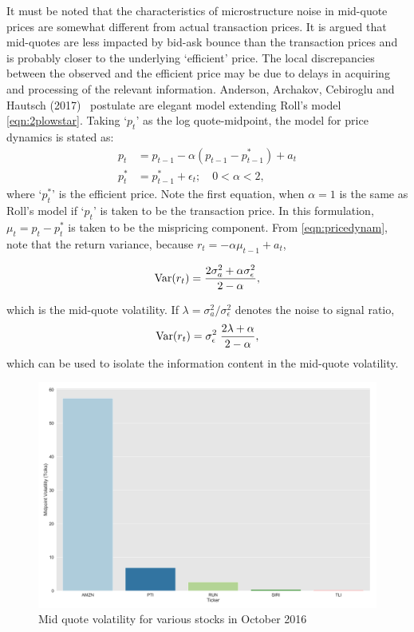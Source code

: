 It must be noted that the characteristics of microstructure noise in mid-quote prices are somewhat different from actual transaction prices. It is argued that mid-quotes are less impacted by bid-ask bounce than the transaction prices and is probably closer to the underlying `efficient' price. The local discrepancies between the observed and the efficient price may be due to delays in acquiring and processing of the relevant information. Anderson, Archakov, Cebiroglu and Hautsch (2017)~\cite{archcebha17} postulate are elegant model extending Roll's model \eqref{eqn:2plowstar}. Taking `$p_t$' as the log quote-midpoint, the model for price dynamics is stated as:
	\begin{equation}\label{eqn:pricedynam}	
	\begin{split}
	p_t&= p_{t-1} - \alpha (p_{t-1} - p_{t-1}^*) + a_t \\
	p_t^*&= p_{t-1}^* + \epsilon_t; \quad 0<\alpha<2,
	\end{split}
	\end{equation}
where `$p_t^*$' is the efficient price. Note the first equation, when $\alpha=1$ is the same as Roll's model if `$p_t$' is taken to be the transaction price. In this formulation, $\mu_t= p_t - p_t^*$ is taken to be the mispricing component. From \eqref{eqn:pricedynam}, note that the return variance, because $r_t= -\alpha \mu_{t-1} + a_t$,
	
	\begin{equation}
	\operatorname{Var}(r_t)= \dfrac{2\sigma_a^2 + \alpha \sigma_\epsilon^2}{2 - \alpha},
	\end{equation}
	
which is the mid-quote volatility. If $\lambda= \sigma_a^2/\sigma_\epsilon^2$ denotes the noise to signal ratio,
	\begin{equation} \label{eqn:signalrationoise}
	\var(r_t)= \sigma_\epsilon^2\;  \dfrac{2\lambda + \alpha}{2-\alpha},
	\end{equation}
which can be used to isolate the information content in the mid-quote volatility. 


	\begin{figure}[!ht]
	\centering
	\includegraphics[width=\textwidth]{chapters/chapter_trade_data_models/figures/mid_vol.png} 
	\caption{Mid quote volatility for various stocks in October 2016\label{fig:mid_vol}}
	\end{figure}


